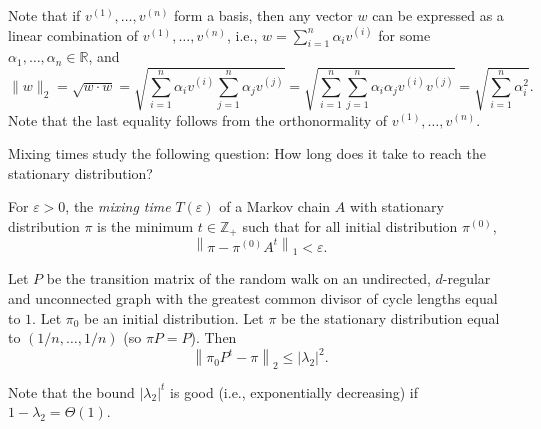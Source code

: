 \documentclass[letterpaper, reqno,11pt]{article}
\newcommand{\RR}{\mathbb{R}}
\newcommand{\ZZ}{\mathbb{Z}}
\begin{document}
Note that if $v^{(1)}, \ldots, v^{(n)}$ form a basis, then any vector $w$ can be expressed as a linear combination of $v^{(1)}, \ldots, v^{(n)}$, i.e., $w = \sum_{i = 1}^n \alpha_i v^{(i)}$ for some $\alpha_1, \ldots, \alpha_n \in \RR$, and
\begin{equation} \label{eq:l2-norm}
  \| w \|_2 = \sqrt{w \cdot w} = \sqrt{\sum_{i = 1}^n \alpha_i v^{(i)} \sum_{j = 1}^n \alpha_j v^{(j)}} = \sqrt{\sum_{i = 1}^n \sum_{j = 1}^n \alpha_i \alpha_j v^{(i)} v^{(j)}} = \sqrt{\sum_{i = 1}^n \alpha_i^2}.
\end{equation}
Note that the last equality follows from the orthonormality of $v^{(1)}, \ldots, v^{(n)}$.

Mixing times study the following question: How long does it take to reach the stationary distribution?

\begin{definition}
  For $\varepsilon > 0$, the \emph{mixing time} $T(\varepsilon)$ of a Markov chain $A$ with stationary distribution $\pi$ is the minimum $t \in \ZZ_+$ such that for all initial distribution $\pi^{(0)}$,
  $$ \left\| \pi - \pi^{(0)} A^t \right\|_1 < \varepsilon. $$
\end{definition}

\begin{theorem} \label{thm:mixing}
  Let $P$ be the transition matrix of the random walk on an undirected, $d$-regular and unconnected graph with the greatest common divisor of cycle lengths equal to $1$. Let $\pi_0$ be an initial distribution. Let $\pi$ be the stationary distribution equal to $(1/n, \ldots, 1/n)$ (so $\pi P  = P$). Then
  $$ \left\| \pi_0 P^t - \pi \right\|_2 \leq \left|\lambda_2\right|^2. $$
\end{theorem}

Note that the bound $|\lambda_2|^t$ is good (i.e., exponentially decreasing) if $1 - \lambda_2 = \Theta(1)$.
\end{document}
